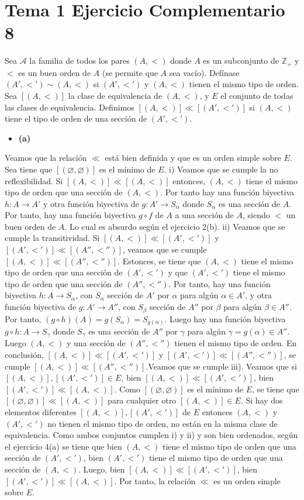 \documentclass{article}
\begin{document}
\section{Tema 1 Ejercicio Complementario 8}
Sea $\mathcal{A}$ la familia de todos los pares $(A,<)$ donde $A$ es un subconjunto de $\mathbb{Z}_{+}$ y $<$ es un buen orden de $A$ (se permite que $A$ sea vacío). Defínase $(A',<')\sim (A,<)$ si $(A',<')$ y $(A,<)$ tienen el mismo tipo de orden.
Sea $[(A,<)]$ la clase de equivalencia de $(A,<)$, y $E$ el conjunto de todas las clases de equivalencia. Definimos $[(A,<)]\ll [(A',<')]$ si $(A,<)$ tiene el tipo de orden de una sección de $(A',<')$.
\begin{itemize}
\item \bf (a) \rm
\end{itemize}
Veamos que la relación $\ll$ está bien definida y que es un orden simple sobre $E$. Sea tiene que $[(\varnothing,\varnothing)]$ es el mínimo de $E$. i) Veamos que se cumple la no reflexibilidad. Si $[(A,<)]\ll [(A,<)]$ entonces,  
$(A,<)$ tiene el mismo tipo de orden que una sección de $(A,<)$. Por tanto hay una función biyectiva $h:A\rightarrow A'$ y otra función biyectiva de $g:A' \rightarrow S_\alpha$ donde $S_\alpha$ es una sección de $A$. Por tanto, hay una función biyectiva $g\circ f$ de $A$ a una sección de $A$, siendo $<$ un buen orden de $A$. Lo cual es absurdo según el ejercicio 2(b).
ii) Veamos que se cumple la transitividad. Si $[(A,<)]\ll [(A',<')]$ y $[(A',<')]\ll [(A'',<'')]$, veamos que se cumple $[(A,<)]\ll [(A'',<'')]$.
Estonces, se tiene que $(A,<)$ tiene el mismo tipo de orden que una sección de $(A',<')$ y que $(A',<')$ tiene el mismo tipo de orden que una sección de $(A'',<'')$. Por tanto, hay una función biyectiva $h:A\rightarrow S_\alpha$, con $S_\alpha$ sección de $A'$ por $\alpha$ para algún $\alpha\in A'$, y otra función biyectiva de $g:A' \rightarrow A'' $, con $S_\beta$ sección de $A''$ por $\beta$ para algún $\beta\in A''$. Por tanto, $(g\circ h)(A)=g(S_{\alpha})=S_{g(\alpha)}$. Luego hay una función biyectiva $g\circ h: A\rightarrow S_\gamma$  donde $S_\gamma$ es una sección de $A''$ por $\gamma$ para algún $\gamma=g(\alpha)\in A''$. Luego $(A,<)$ y una sección de $(A'',<'')$ tienen el mismo tipo de orden. En  conclusión, $[(A,<)]\ll [(A',<')]$ y $[(A',<')]\ll [(A'',<'')]$, se cumple $[(A,<)]\ll [(A'',<'')]$.Veamos que se cumple iii). Veamos que si $[(A,<)],[(A',<')]\in E$, bien  $[(A,<)]\ll[(A',<')]$, bien $[(A',<')]\ll[(A,<)]$. Como $[(\varnothing,\varnothing)]$ es el mínimo de $E$, se tiene que $[(\varnothing,\varnothing)]\ll[(A,<)]$ para cualquier otro $[(A,<)]\in E$. Si hay dos elementos diferentes $[(A,<)],[(A',<')]$ de $E$ entonces $(A,<)$ y $(A',<')$ no tienen el mismo tipo de orden, no están en la misma clase de equivalencia. Como ambos conjuntos cumplen i) y ii) y son bien ordenados, según el ejercicio 4(a) se tiene que bien $(A,<)$ tiene el mismo tipo de orden que una sección de $(A',<')$, bien $(A',<')$ tiene el mismo tipo de orden que una sección de $(A,<)$. Luego, bien  $[(A,<)]\ll[(A',<')]$, bien $[(A',<')]\ll[(A,<)]$.  Por tanto, la relación $\ll$ es un orden simple sobre $E$.
\end{document}
